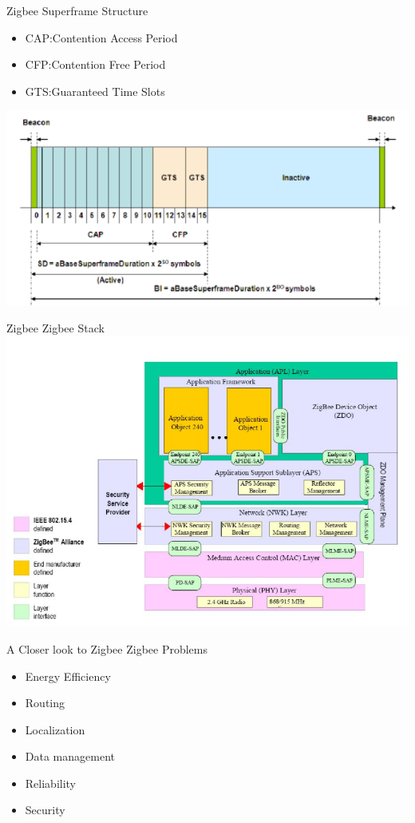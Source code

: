 \documentclass[serif,Blue]{beamer}
\begin{document}
\begin{frame}{Zigbee}
	Superframe Structure
	\begin{itemize}
		\item CAP:\@ Contention Access Period
		\item CFP:\@ Contention Free Period
		\item GTS:\@ Guaranteed Time Slots
	\end{itemize}
	\center\includegraphics[scale=.3]{img/sframe.png}
\end{frame}

\begin{frame}{Zigbee}
	Zigbee Stack
	\center\includegraphics[scale=1]{img/zstack.png}
\end{frame}



\begin{frame}{A Closer look to Zigbee}
	Zigbee Problems
	\begin{itemize}\justifying{}
		\item Energy Efficiency
		\item Routing
		\item Localization
		\item Data management
		\item Reliability
		\item Security
	\end{itemize}
\end{frame}
\end{document}
